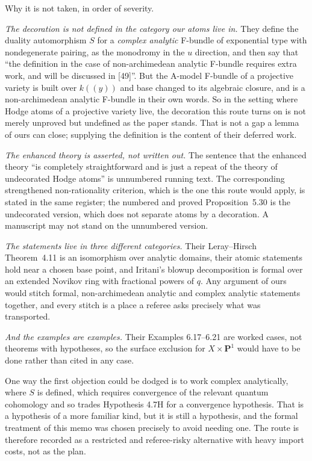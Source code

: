 \documentclass[11pt]{article}
\theoremstyle{definition}
\theoremstyle{remark}
\newcommand{\PP}{\mathbf P}
\begin{document}
Why it is not taken, in order of severity.

\emph{The decoration is not defined in the category our atoms live in.} They
define the duality automorphism $S$ for a \emph{complex analytic} F-bundle of
exponential type with nondegenerate pairing, as the monodromy in the $u$
direction, and then say that ``the definition in the case of non-archimedean
analytic F-bundle requires extra work, and will be discussed in [49]''. But the
A-model F-bundle of a projective variety is built over $k((y))$ and base changed
to its algebraic closure, and is a non-archimedean analytic F-bundle in their own
words. So in the setting where Hodge atoms of a projective variety live, the
decoration this route turns on is not merely unproved but undefined as the paper
stands. That is not a gap a lemma of ours can close; supplying the definition is
the content of their deferred work.

\emph{The enhanced theory is asserted, not written out.} The sentence that the
enhanced theory ``is completely straightforward and is just a repeat of the
theory of undecorated Hodge atoms'' is unnumbered running text. The
corresponding strengthened non-rationality criterion, which is the one this route
would apply, is stated in the same register; the numbered and proved
Proposition~5.30 is the undecorated version, which does not separate atoms by a
decoration. A manuscript may not stand on the unnumbered version.

\emph{The statements live in three different categories.} Their Leray--Hirsch
Theorem~4.11 is an isomorphism over analytic domains, their atomic statements
hold near a chosen base point, and Iritani's blowup decomposition is formal over
an extended Novikov ring with fractional powers of $q$. Any argument of ours
would stitch formal, non-archimedean analytic and complex analytic statements
together, and every stitch is a place a referee asks precisely what was
transported.

\emph{And the examples are examples.} Their Examples 6.17--6.21 are worked cases,
not theorems with hypotheses, so the surface exclusion for $X\times\PP^1$ would
have to be done rather than cited in any case.

One way the first objection could be dodged is to work complex analytically,
where $S$ is defined, which requires convergence of the relevant quantum
cohomology and so trades Hypothesis 4.7H for a convergence hypothesis. That is a
hypothesis of a more familiar kind, but it is still a hypothesis, and the formal
treatment of this memo was chosen precisely to avoid needing one. The route is
therefore recorded as a restricted and referee-risky alternative with heavy
import costs, not as the plan.
\end{document}
